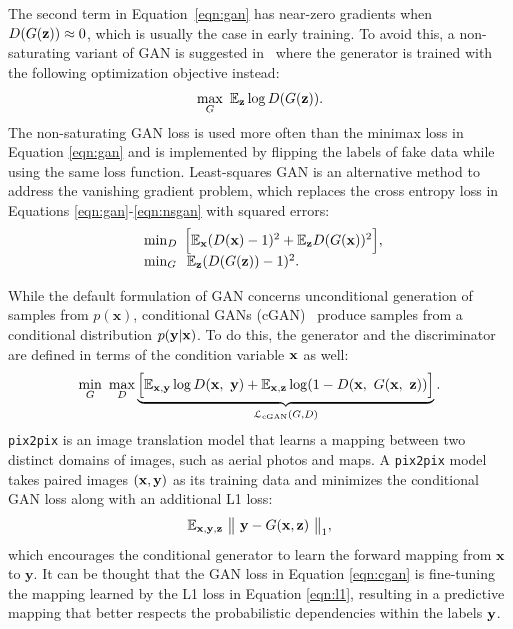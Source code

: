 The second term in Equation~\ref{eqn:gan} has near-zero gradients when $D(G(\mathbf{z})) \approx 0$, which is usually the case in early training. To avoid this, a non-saturating variant of GAN is suggested in~\cite{goodfellow2014gan} where the generator is trained with the following optimization objective instead:
\begin{equation}\label{eqn:nsgan}
\max_{G}~ \mathbb{E}_{\mathbf{z}} \log D(G(\mathbf{z})).
\end{equation}
The non-saturating GAN loss is used more often than the minimax loss in Equation \ref{eqn:gan} and is implemented by flipping the labels of fake data while using the same loss function.
Least-squares GAN \cite{mao2017lsgan} is an alternative method to address the vanishing gradient problem, which replaces the cross entropy loss in Equations \ref{eqn:gan}-\ref{eqn:nsgan} with squared errors:%
\begin{equation}\label{eqn:lsgan}
	\begin{array}{l@{}l}
	\min_{D} ~\Big [ \E_{\x} (D(\x) - 1)^2 + \E_{\z} D(G(\x))^2 \Big ], \\
	\min_{G} ~\>\E_{\z} (D(G(\z)) - 1)^2.
	\end{array}
\end{equation}


While the default formulation of GAN concerns unconditional generation of samples from $p(\mathbf{x})$, conditional GANs (cGAN)~\cite{mirza2014conditional} produce samples from a conditional distribution $p(\mathbf{y}|{\mathbf x})$. To do this, the generator and the discriminator are defined in terms of                                                                                                                                                                                                                                                     the condition variable ${\mathbf x}$ as well:
\begin{equation}\label{eqn:cgan}
\min_{G}~\max_{D}\underbrace{\Big [ \mathbb{E}_{{\mathbf x},\mathbf{y}} \log D({\mathbf x},~\mathbf{y}) + \mathbb{E}_{{\mathbf x},\mathbf{z}} \log (1 - D ( {\mathbf x},~ G({\mathbf x},~\mathbf{z})) \Big ]}_{{\cal L}_{\text{cGAN}}(G, D)}.
\end{equation}
\texttt{pix2pix} \cite{isola2017pix2pix} is an image translation model that learns a mapping between two distinct domains of images, such as aerial photos and maps.
A \texttt{pix2pix} model takes paired images $({\mathbf x}, \mathbf{y})$ as its training data and minimizes the conditional GAN loss along with an additional L1 loss:
\begin{equation}\label{eqn:l1}
\mathbb{E}_{\mathbf{x},\mathbf{y},\mathbf{z}} ~ \big \lVert ~ \mathbf{y} - G({\mathbf x}, \mathbf{z}) ~ \big \rVert_1,
\end{equation}
which encourages the conditional generator to learn the forward mapping from $\mathbf{x}$ to $\mathbf{y}$. It can be thought that the GAN loss in Equation \ref{eqn:cgan} is fine-tuning the mapping learned by the L1 loss in Equation \ref{eqn:l1}, resulting in a predictive mapping that better respects the probabilistic dependencies within the labels $\mathbf{y}$.

